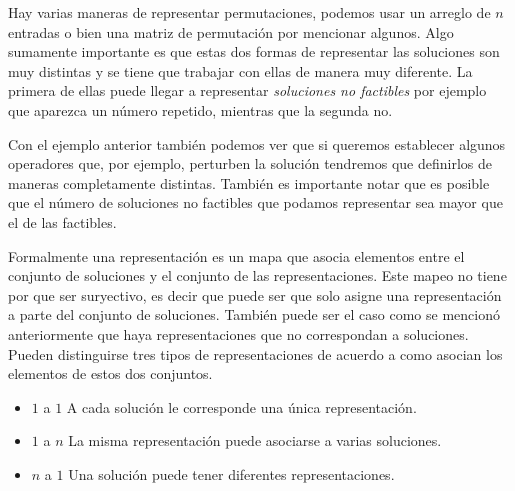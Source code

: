 Hay varias maneras de representar permutaciones, podemos usar un arreglo de $n$ entradas o bien una matriz de permutación por mencionar algunos. Algo sumamente importante es que estas dos formas de representar las soluciones son muy distintas y se tiene que trabajar con ellas de manera muy diferente. La primera de ellas puede llegar a representar \textit{soluciones no factibles} por ejemplo que aparezca un número repetido, mientras que la segunda no.

Con el ejemplo anterior también podemos ver que si queremos establecer algunos operadores que, por ejemplo, perturben la solución tendremos que definirlos de maneras completamente distintas. También es importante notar que es posible que el número de soluciones no factibles que podamos representar sea mayor que el de las factibles.

Formalmente una representación es un mapa que asocia elementos entre el conjunto de soluciones y el conjunto de las representaciones. Este mapeo no tiene por que ser suryectivo, es decir que puede ser que solo asigne una representación a parte del conjunto de soluciones. También puede ser el caso como se mencionó anteriormente que haya representaciones que no correspondan a soluciones. Pueden distinguirse tres tipos de representaciones\cite{Cheng1996} de acuerdo a como asocian los elementos de estos dos conjuntos.
\begin{itemize}
    \item $1$ a $1$ A cada solución le corresponde una única representación.
    \item $1$ a $n$ La misma representación puede asociarse a varias soluciones.
    \item $n$ a $1$ Una solución puede tener diferentes representaciones.
\end{itemize}

